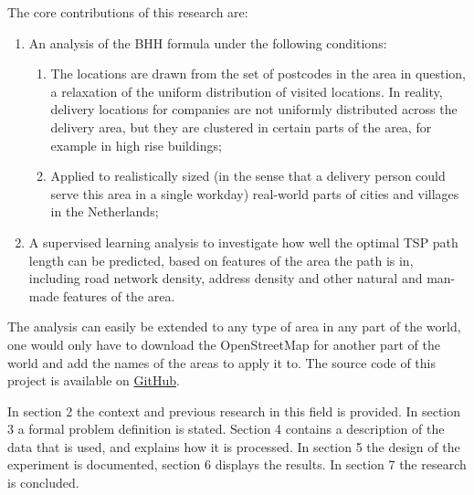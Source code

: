 The core contributions of this research are:
\begin{enumerate}
	\item An analysis of the BHH formula under the following conditions:
	      \begin{enumerate}
		      \item The locations are drawn from the set of postcodes in the area in question, a relaxation of the uniform distribution of visited
		            locations. In reality, delivery locations for companies are not uniformly distributed across the delivery area, but they are clustered
		            in certain parts of the area, for example in high rise buildings;
		      \item Applied to realistically sized (in the sense that a delivery person could serve this area in a single workday) real-world parts of
		            cities and villages in the Netherlands;
	      \end{enumerate}
	\item A supervised learning analysis to investigate how well the optimal TSP path length can be
	      predicted, based on features of the area the path is in, including road network density,
	      address density and other natural and man-made features of the area.
\end{enumerate}
The analysis can easily be extended to any type of area in any part of the world, one would only
have to download the OpenStreetMap \citep{openstreetmap} for another part of the world and add the names of the areas
to apply it to. The source code of this project is available on
\href{https://github.com/koen1859/BSc_Thesis}{GitHub}.

In section 2 the context and previous research in this field is provided.
In section 3 a formal problem definition is stated. 
Section 4 contains a description of the data that is used, and explains how it is processed.
In section 5 the design of the experiment is documented, section 6 displays the results.
In section 7 the research is concluded.
